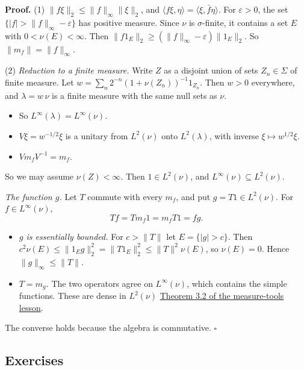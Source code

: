 \documentclass[
  english,
  11pt,
  a4paper,
]{article}
\providecommand{\tightlist}{%
  \setlength{\itemsep}{0pt}\setlength{\parskip}{0pt}}
\begin{document}
\textbf{Proof.} (1) \(\|f\xi\|_2\le\|f\|_\infty\|\xi\|_2\), and
\(\langle f\xi,\eta\rangle=\langle\xi,\bar f\eta\rangle\). For
\(\varepsilon>0\), the set \(\{|f|>\|f\|_\infty-\varepsilon\}\) has
positive measure. Since \(\nu\) is \(\sigma\)-finite, it contains a set
\(E\) with \(0<\nu(E)<\infty\). Then
\(\|f1_E\|_2\ge(\|f\|_\infty-\varepsilon)\|1_E\|_2\). So
\(\|m_f\|=\|f\|_\infty\).

(2) \emph{Reduction to a finite measure.} Write \(Z\) as a disjoint
union of sets \(Z_n\in\Sigma\) of finite measure. Let
\(w=\sum_n2^{-n}(1+\nu(Z_n))^{-1}1_{Z_n}\). Then \(w>0\) everywhere, and
\(\lambda=w\,\nu\) is a finite measure with the same null sets as
\(\nu\).

\begin{itemize}
\tightlist
\item
  So \(L^\infty(\lambda)=L^\infty(\nu)\).
\item
  \(V\xi=w^{-1/2}\xi\) is a unitary from \(L^2(\nu)\) onto
  \(L^2(\lambda)\), with inverse \(\xi\mapsto w^{1/2}\xi\).
\item
  \(Vm_fV^{-1}=m_f\).
\end{itemize}

So we may assume \(\nu(Z)<\infty\). Then \(1\in L^2(\nu)\), and
\(L^\infty(\nu)\subseteq L^2(\nu)\).

\emph{The function \(g\).} Let \(T\) commute with every \(m_f\), and put
\(g=T1\in L^2(\nu)\). For \(f\in L^\infty(\nu)\),
\[Tf=Tm_f1=m_fT1=fg .\]

\begin{itemize}
\tightlist
\item
  \emph{\(g\) is essentially bounded.} For \(c>\|T\|\) let
  \(E=\{|g|>c\}\). Then
  \(c^2\nu(E)\le\|1_Eg\|_2^2=\|T1_E\|_2^2\le\|T\|^2\nu(E)\), so
  \(\nu(E)=0\). Hence \(\|g\|_\infty\le\|T\|\).
\item
  \emph{\(T=m_g\).} The two operators agree on \(L^\infty(\nu)\), which
  contains the simple functions. These are dense in \(L^2(\nu)\)
  \hyperref[measure-and-hilbert-space-tools--3-the-complete-spaces-of-integrable-functions]{Theorem
  3.2 of the measure-tools lesson}.
\end{itemize}

The converse holds because the algebra is commutative. \(\square\)

\subsection{Exercises}\label{hilbert-spaces-and-compact-operators--exercises}
\end{document}
